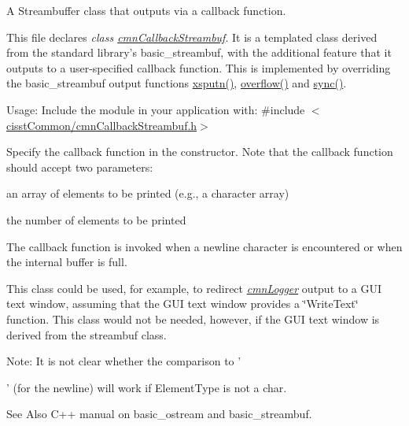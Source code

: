 A Streambuffer class that outputs via a callback function. 

This file declares {\itshape class \hyperlink{classcmn_callback_streambuf}{cmn\-Callback\-Streambuf}}. It is a templated class derived from the standard library's basic\-\_\-streambuf, with the additional feature that it outputs to a user-\/specified callback function. This is implemented by overriding the basic\-\_\-streambuf output functions \hyperlink{classcmn_callback_streambuf_ac5b9db0adad90622d6681c085d296b6c}{xsputn()}, \hyperlink{classcmn_callback_streambuf_ab06c380ed8bfd927dc4a83b3f3a18a39}{overflow()} and \hyperlink{classcmn_callback_streambuf_a8a8beb77b32c7f2856092e656632ac7c}{sync()}.

Usage\-: Include the module in your application with\-: \#include $<$\hyperlink{cmn_callback_streambuf_8h}{cisst\-Common/cmn\-Callback\-Streambuf.\-h}$>$

Specify the callback function in the constructor. Note that the callback function should accept two parameters\-:
\begin{DoxyEnumerate}
\item an array of elements to be printed (e.\-g., a character array)
\item the number of elements to be printed
\end{DoxyEnumerate}

The callback function is invoked when a newline character is encountered or when the internal buffer is full.

This class could be used, for example, to redirect {\itshape \hyperlink{classcmn_logger}{cmn\-Logger}} output to a G\-U\-I text window, assuming that the G\-U\-I text window provides a \char`\"{}\-Write\-Text\char`\"{} function. This class would not be needed, however, if the G\-U\-I text window is derived from the streambuf class.

Note\-: It is not clear whether the comparison to '\par
' (for the newline) will work if Element\-Type is not a char.

\begin{DoxySeeAlso}{See Also}
C++ manual on basic\-\_\-ostream and basic\-\_\-streambuf. 
\end{DoxySeeAlso}


